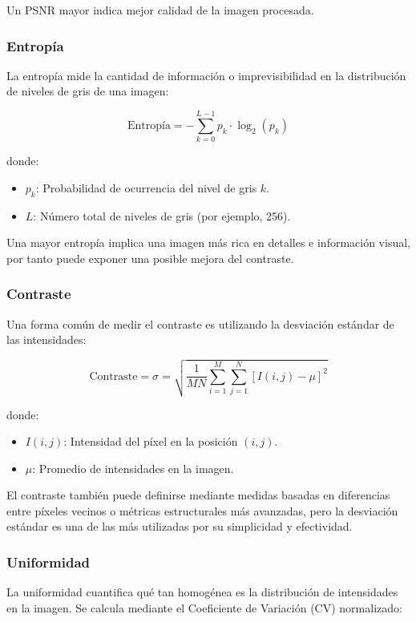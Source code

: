 \documentclass[sigchi]{acmart}
\begin{document}
Un PSNR mayor indica mejor calidad de la imagen procesada.

\subsubsection{\textbf{Entropía}}
La entropía mide la cantidad de información o imprevisibilidad en la distribución de niveles de gris de una imagen:

\begin{equation}
	\text{Entropía} = - \sum_{k=0}^{L-1} p_k \cdot \log_2(p_k)
\end{equation}

donde:
\begin{itemize}
	\item $p_k$: Probabilidad de ocurrencia del nivel de gris $k$.
	\item $L$: Número total de niveles de gris (por ejemplo, 256).
\end{itemize}

Una mayor entropía implica una imagen más rica en detalles e información visual, por tanto
puede exponer una posible mejora del contraste.

\subsubsection{\textbf{Contraste}}
Una forma común de medir el contraste es utilizando la desviación estándar de las intensidades:

\begin{equation}
	\text{Contraste} = \sigma = \sqrt{\frac{1}{MN} \sum_{i=1}^{M} \sum_{j=1}^{N} \left[ I(i,j) - \mu \right]^2}
\end{equation}

donde:
\begin{itemize}
	\item $I(i,j)$: Intensidad del píxel en la posición $(i,j)$.
	\item $\mu$: Promedio de intensidades en la imagen.
\end{itemize}

El contraste también puede definirse mediante medidas basadas en diferencias entre píxeles
vecinos o métricas estructurales más avanzadas, pero la desviación estándar es una de las más
utilizadas por su simplicidad y efectividad.

\subsubsection{\textbf{Uniformidad}}
La uniformidad cuantifica qué tan homogénea es la distribución de intensidades en la imagen. Se
calcula mediante el Coeficiente de Variación (CV) normalizado:
\end{document}
